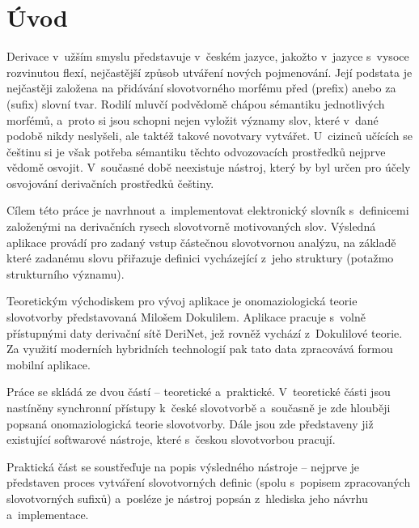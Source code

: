 \hypertarget{uxfavod}{%
\chapter*{Úvod}\label{uvod}}

Derivace v~užším smyslu představuje v~českém jazyce, jakožto v~jazyce
s~vysoce rozvinutou flexí, nejčastější způsob utváření nových pojmenování.
Její podstata je nejčastěji založena na přidávání slovotvorného morfému
před (prefix) anebo za (sufix) slovní tvar. Rodilí mluvčí podvědomě
chápou sémantiku jednotlivých morfémů, a~proto si jsou schopni nejen
vyložit významy slov, které v~dané podobě nikdy neslyšeli, ale taktéž
takové novotvary vytvářet. U~cizinců učících se češtinu si je však
potřeba sémantiku těchto odvozovacích prostředků nejprve vědomě osvojit.
V~současné době neexistuje nástroj, který by byl určen pro účely
osvojování derivačních prostředků češtiny.

Cílem této práce je navrhnout a~implementovat elektronický slovník
s~definicemi založenými na derivačních rysech slovotvorně motivovaných
slov. Výsledná aplikace provádí pro zadaný vstup částečnou slovotvornou
analýzu, na základě které zadanému slovu přiřazuje definici vycházející
z~jeho struktury (potažmo strukturního významu).

Teoretickým východiskem pro vývoj aplikace je onomaziologická teorie
slovotvorby představovaná Milošem Dokulilem. Aplikace pracuje s~volně
přístupnými daty derivační sítě DeriNet, jež rovněž vychází z~Dokulilové
teorie. Za využití moderních hybridních technologií pak tato data
zpracovává formou mobilní aplikace.

Práce se skládá ze dvou částí -- teoretické a~praktické. V~teoretické
části jsou nastíněny synchronní přístupy k~české slovotvorbě a~současně
je zde hlouběji popsaná onomaziologická teorie slovotvorby. Dále jsou
zde představeny již existující softwarové nástroje, které s~českou
slovotvorbou pracují.

Praktická část se soustřeďuje na popis výsledného nástroje -- nejprve je
představen proces vytváření slovotvorných definic (spolu s~popisem
zpracovaných slovotvorných sufixů) a~posléze je nástroj popsán
z~hlediska jeho návrhu a~implementace.
